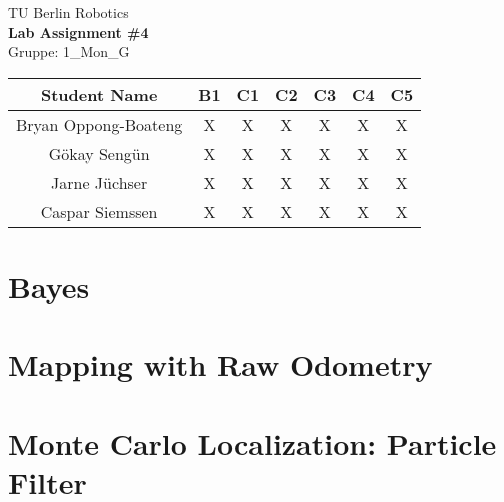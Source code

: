 \documentclass[12pt,fleqn]{article}
\numberwithin{subsection}{section}
\begin{document}
\noindent 
\huge
\medskip
TU Berlin Robotics\\
\textbf{Lab Assignment \#4}\\

\normalsize
\noindent
\bigskip
Gruppe: 1\_Mon\_G \\
\medskip
\begin{tabular}[c]{|c|c|c|c|c|c|c|}
    \hline
    Student Name & B1 & C1 & C2 & C3 & C4 & C5\\
    \hline
    \hline
    Bryan Oppong-Boateng & X & X & X & X & X & X \\
    \hline
    Gökay Sengün & X & X & X & X & X & X \\
    \hline
    Jarne Jüchser & X & X & X & X & X & X \\
    \hline
    Caspar Siemssen & X & X & X & X & X & X \\
    \hline
\end{tabular}

\section{Bayes}


\section{Mapping with Raw Odometry}


\section{Monte Carlo Localization: Particle Filter}

\end{document}
